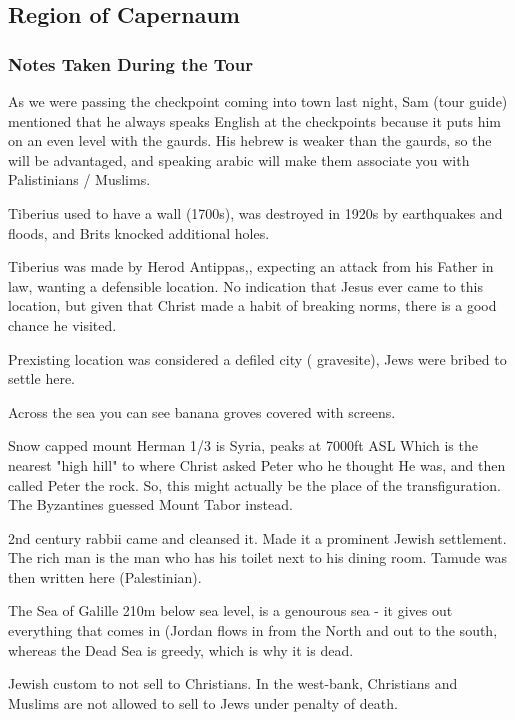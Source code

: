 \documentclass[letterpaper]{report}
\begin{document}
\clearpage
\subsection{Region of Capernaum}
\begin{multicols}{2}
	\mbox{}
\end{multicols}
\subsubsection{Notes Taken During the Tour}
As we were passing the checkpoint coming into town last night, Sam (tour guide) mentioned that he always speaks English at the checkpoints because it puts him on an even level with the gaurds. His hebrew is weaker than the gaurds, so the will be advantaged, and speaking arabic will make them associate you with Palistinians / Muslims.

Tiberius used to have a wall (1700s), was destroyed in 1920s by earthquakes and floods, and Brits knocked additional holes.

Tiberius was made by Herod Antippas,, expecting an attack from his Father in law, wanting a defensible location.
No indication that Jesus ever came to this location, but given that Christ made a habit of breaking norms, there is a good chance he visited.

Prexisting location was considered a defiled city ( gravesite), Jews were bribed to settle here.

Across the sea you can see banana groves covered with screens.

Snow capped mount Herman 1/3 is Syria, peaks at 7000ft ASL Which is the nearest "high hill" to where Christ asked Peter who he thought He was, and then called Peter the rock. So, this might actually be the place of the transfiguration. The Byzantines guessed Mount Tabor instead.

2nd century rabbii came and cleansed it. Made it a prominent Jewish settlement. 
The rich man is the man who has his toilet next to his dining room.
Tamude was then written here (Palestinian).

The Sea of Galille 210m below sea level, is a genourous sea - it gives out everything that comes in (Jordan flows in from the North and out to the south, whereas the Dead Sea is greedy, which is why it is dead.

Jewish custom to not sell to Christians.
In the west-bank, Christians and Muslims are not allowed to sell to Jews under penalty of death.
\end{document}
